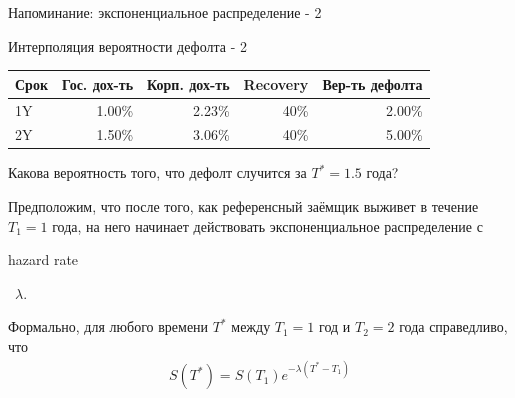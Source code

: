 \documentclass{beamer}
\newcommand{\en}[1]{\begin{otherlanguage}{english}#1\end{otherlanguage}}
\begin{document}
\begin{frame}{Напоминание: экспоненциальное распределение - 2}
\centering
{}
\end{frame}



\begin{frame}{Интерполяция вероятности дефолта - 2}
\centering
\begin{tabular}{l|r|r|r|r}
Срок & Гос. дох-ть & Корп. дох-ть & Recovery & Вер-ть дефолта \\ \hline
1Y & 1.00\% & 2.23\% & 40\% & 2.00\% \\
2Y & 1.50\% & 3.06\% & 40\% & 5.00\%
\end{tabular}

\justify
Какова вероятность того, что дефолт случится за $T^*=1.5$ года?

\justify
Предположим, что после того, как референсный заёмщик выживет в течение $T_1=1$ года, на него начинает действовать экспоненциальное распределение с \en{hazard rate}\ $\lambda$.

\justify
Формально, для любого времени $T^*$ между $T_1=1$ год и $T_2=2$ года справедливо, что
\begin{align*}
S(T^*) = S(T_1)e^{-\lambda(T^* - T_1)}
\end{align*}
\end{frame}



\newcommand{\nodeWithDropLines}[2]{
    \node[
        circle,
        fill,
        color=Set1-A,
        inner sep=2pt
    ]
    at (axis cs: #1, #2)
    {};

    \draw[
        dashed,
        thick
    ]
    (axis cs: 0, #2) -- (axis cs: #1, #2) -- (axis cs: #1, 0);
}
\end{document}
